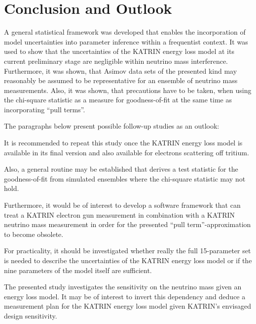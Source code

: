 \section{Conclusion and Outlook}
\label{sec:katrinElossModelOutlook}
A general statistical framework was developed that enables the incorporation of model uncertainties into parameter inference within a frequentist context. It was used to show that the uncertainties of the KATRIN energy loss model at its current preliminary stage are negligible within neutrino mass interference. Furthermore, it was shown, that Asimov data sets of the presented kind may reasonably be assumed to be representative for an ensemble of neutrino mass measurements. Also, it was shown, that precautions have to be taken, when using the chi-square statistic as a measure for goodness-of-fit at the same time as incorporating ``pull terms''. 

The paragraphs below present possible follow-up studies as an outlook:

It is recommended to repeat this study once the KATRIN energy loss model is available in its final version and also available for electrons scattering off tritium.

Also, a general routine may be established that derives a test statistic for the goodness-of-fit from simulated ensembles where the chi-square statistic may not hold. 

Furthermore, it would be of interest to develop a software framework that can treat a KATRIN electron gun measurement in combination with a KATRIN neutrino mass measurement in order for the presented ``pull term''-approximation to become obsolete.

For practicality, it should be investigated whether really the full 15-parameter set is needed to describe the uncertainties of the KATRIN energy loss model or if the nine parameters of the model itself are sufficient.

The presented study investigates the sensitivity on the neutrino mass given an energy loss model. It may be of interest to invert this dependency and deduce a measurement plan for the KATRIN energy loss model given KATRIN's envisaged design sensitivity.